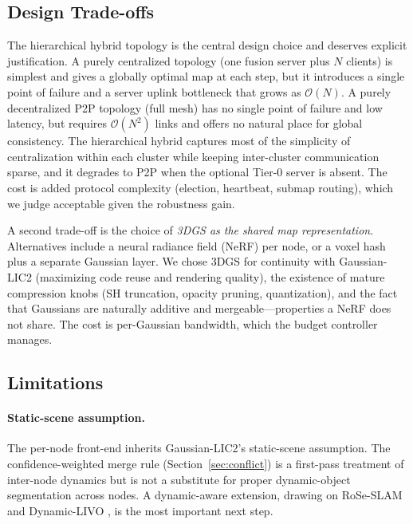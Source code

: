 \label{sec:discussion}

\subsection{Design Trade-offs}

The hierarchical hybrid topology is the central design choice and deserves
explicit justification. A purely centralized topology (one fusion server plus
$N$ clients) is simplest and gives a globally optimal map at each step, but it
introduces a single point of failure and a server uplink bottleneck that grows
as $\mathcal{O}(N)$. A purely decentralized P2P topology (full mesh) has no
single point of failure and low latency, but requires $\mathcal{O}(N^2)$ links
and offers no natural place for global consistency. The hierarchical hybrid
captures most of the simplicity of centralization within each cluster while
keeping inter-cluster communication sparse, and it degrades to P2P when the
optional Tier-0 server is absent. The cost is added protocol complexity
(election, heartbeat, submap routing), which we judge acceptable given the
robustness gain.

A second trade-off is the choice of \emph{3DGS as the shared map
representation}. Alternatives include a neural radiance field (NeRF) per node,
or a voxel hash plus a separate Gaussian layer. We chose 3DGS for continuity
with Gaussian-LIC2 (maximizing code reuse and rendering quality), the
existence of mature compression knobs (SH truncation, opacity pruning,
quantization), and the fact that Gaussians are naturally additive and
mergeable---properties a NeRF does not share. The cost is per-Gaussian
bandwidth, which the budget controller manages.

\subsection{Limitations}

\paragraph{Static-scene assumption.} The per-node front-end inherits
Gaussian-LIC2's static-scene assumption. The confidence-weighted merge rule
(Section~\ref{sec:conflict}) is a first-pass treatment of inter-node dynamics
but is not a substitute for proper dynamic-object segmentation across nodes.
A dynamic-aware extension, drawing on RoSe-SLAM \cite{wang2026roseslam} and
Dynamic-LIVO \cite{zhang2026dynamiclivo}, is the most important next step.

